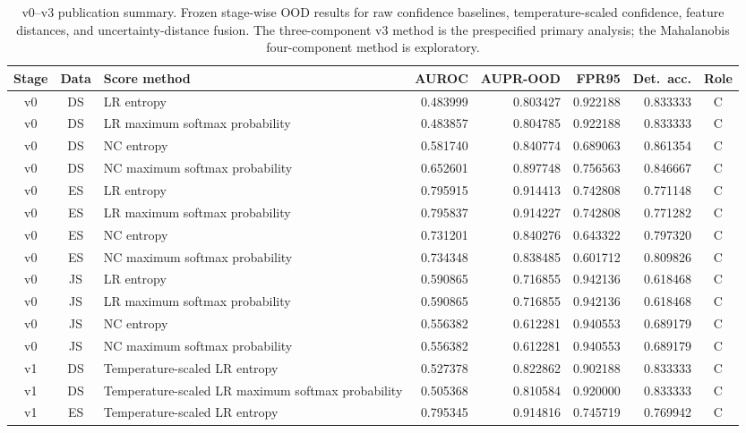 \begin{table}[!t]
  \caption{v0--v3 publication summary. Frozen stage-wise OOD results for raw confidence baselines, temperature-scaled confidence, feature distances, and uncertainty-distance fusion. The three-component v3 method is the prespecified primary analysis; the Mahalanobis four-component method is exploratory.}
  \label{tab:stagewise-summary}
  \centering
  \scriptsize
  \setlength{\tabcolsep}{2.0pt}
  \renewcommand{\arraystretch}{0.92}
  \begin{tabularx}{\textwidth}{@{}c c Y r r r r c@{}}
    \toprule
    Stage & Data & Score method & AUROC & AUPR-OOD & FPR95 & Det.\ acc. & Role \\
    \midrule
    v0 & DS & LR entropy & 0.483999 & 0.803427 & 0.922188 & 0.833333 & C \\
    v0 & DS & LR maximum softmax probability & 0.483857 & 0.804785 & 0.922188 & 0.833333 & C \\
    v0 & DS & NC entropy & 0.581740 & 0.840774 & 0.689063 & 0.861354 & C \\
    v0 & DS & NC maximum softmax probability & 0.652601 & 0.897748 & 0.756563 & 0.846667 & C \\
    v0 & ES & LR entropy & 0.795915 & 0.914413 & 0.742808 & 0.771148 & C \\
    v0 & ES & LR maximum softmax probability & 0.795837 & 0.914227 & 0.742808 & 0.771282 & C \\
    v0 & ES & NC entropy & 0.731201 & 0.840276 & 0.643322 & 0.797320 & C \\
    v0 & ES & NC maximum softmax probability & 0.734348 & 0.838485 & 0.601712 & 0.809826 & C \\
    v0 & JS & LR entropy & 0.590865 & 0.716855 & 0.942136 & 0.618468 & C \\
    v0 & JS & LR maximum softmax probability & 0.590865 & 0.716855 & 0.942136 & 0.618468 & C \\
    v0 & JS & NC entropy & 0.556382 & 0.612281 & 0.940553 & 0.689179 & C \\
    v0 & JS & NC maximum softmax probability & 0.556382 & 0.612281 & 0.940553 & 0.689179 & C \\
    \addlinespace
    v1 & DS & Temperature-scaled LR entropy & 0.527378 & 0.822862 & 0.902188 & 0.833333 & C \\
    v1 & DS & Temperature-scaled LR maximum softmax probability & 0.505368 & 0.810584 & 0.920000 & 0.833333 & C \\
    v1 & ES & Temperature-scaled LR entropy & 0.795345 & 0.914816 & 0.745719 & 0.769942 & C \\

\end{tabularx}
\end{table}
